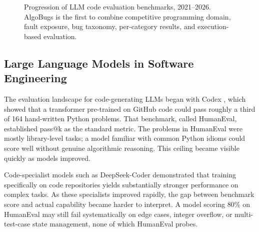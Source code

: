 \begin{figure}[h!]
\centering
{}
\caption{Progression of LLM code evaluation benchmarks, 2021--2026. AlgoBugs is the first to combine competitive programming domain, fault exposure, bug taxonomy, per-category results, and execution-based evaluation.}
\label{fig:benchmark_timeline}
\end{figure}

\subsection{Large Language Models in Software Engineering}

The evaluation landscape for code-generating LLMs began with Codex \cite{chen2021evaluating}, which showed that a transformer pre-trained on GitHub code could pass roughly a third of 164 hand-written Python problems. That benchmark, called HumanEval, established pass@k as the standard metric. The problems in HumanEval were mostly library-level tasks; a model familiar with common Python idioms could score well without genuine algorithmic reasoning. This ceiling became visible quickly as models improved.

Code-specialist models such as DeepSeek-Coder \cite{guo2024deepseek} demonstrated that training specifically on code repositories yields substantially stronger performance on complex tasks. As these specialists improved rapidly, the gap between benchmark score and actual capability became harder to interpret. A model scoring 80\% on HumanEval may still fail systematically on edge cases, integer overflow, or multi-test-case state management, none of which HumanEval probes.

